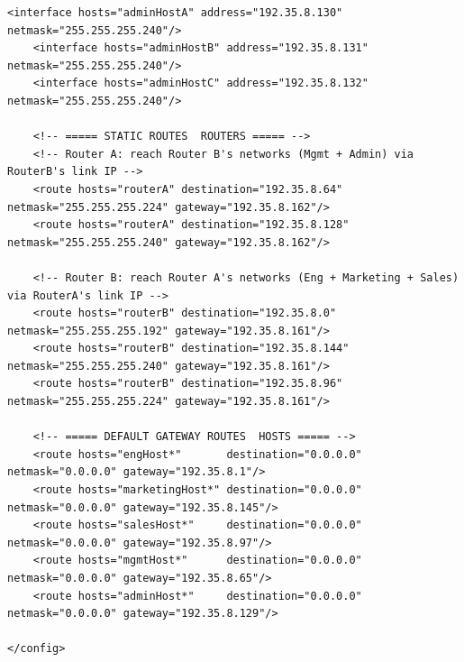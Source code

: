 \documentclass[11pt,a4paper]{article}
\begin{document}
\begin{lstlisting}[style=labcode]
    <interface hosts="adminHostA" address="192.35.8.130" netmask="255.255.255.240"/>
    <interface hosts="adminHostB" address="192.35.8.131" netmask="255.255.255.240"/>
    <interface hosts="adminHostC" address="192.35.8.132" netmask="255.255.255.240"/>

    <!-- ===== STATIC ROUTES  ROUTERS ===== -->
    <!-- Router A: reach Router B's networks (Mgmt + Admin) via RouterB's link IP -->
    <route hosts="routerA" destination="192.35.8.64"  netmask="255.255.255.224" gateway="192.35.8.162"/>
    <route hosts="routerA" destination="192.35.8.128" netmask="255.255.255.240" gateway="192.35.8.162"/>

    <!-- Router B: reach Router A's networks (Eng + Marketing + Sales) via RouterA's link IP -->
    <route hosts="routerB" destination="192.35.8.0"   netmask="255.255.255.192" gateway="192.35.8.161"/>
    <route hosts="routerB" destination="192.35.8.144" netmask="255.255.255.240" gateway="192.35.8.161"/>
    <route hosts="routerB" destination="192.35.8.96"  netmask="255.255.255.224" gateway="192.35.8.161"/>

    <!-- ===== DEFAULT GATEWAY ROUTES  HOSTS ===== -->
    <route hosts="engHost*"       destination="0.0.0.0" netmask="0.0.0.0" gateway="192.35.8.1"/>
    <route hosts="marketingHost*" destination="0.0.0.0" netmask="0.0.0.0" gateway="192.35.8.145"/>
    <route hosts="salesHost*"     destination="0.0.0.0" netmask="0.0.0.0" gateway="192.35.8.97"/>
    <route hosts="mgmtHost*"      destination="0.0.0.0" netmask="0.0.0.0" gateway="192.35.8.65"/>
    <route hosts="adminHost*"     destination="0.0.0.0" netmask="0.0.0.0" gateway="192.35.8.129"/>

</config>
\end{lstlisting}
\end{document}
